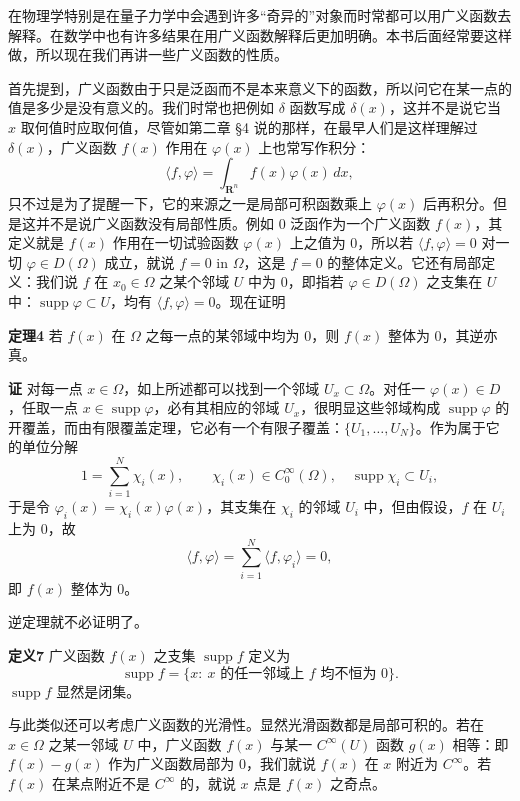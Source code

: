 在物理学特别是在量子力学中会遇到许多“奇异的”对象而时常都可以用广义函数去解释。在数学中也有许多结果在用广义函数解释后更加明确。本书后面经常要这样做，所以现在我们再讲一些广义函数的性质。

首先提到，广义函数由于只是泛函而不是本来意义下的函数，所以问它在某一点的值是多少是没有意义的。我们时常也把例如 $\delta$ 函数写成 $\delta(x)$，这并不是说它当 $x$ 取何值时应取何值，尽管如第二章 §4 说的那样，在最早人们是这样理解过 $\delta(x)$，广义函数 $f(x)$ 作用在 $\varphi(x)$ 上也常写作积分：
\[
 \langle f,\varphi\rangle=\int_{\mathbf R^n}f(x)\varphi(x)\,dx,
\]
只不过是为了提醒一下，它的来源之一是局部可积函数乘上 $\varphi(x)$ 后再积分。但是这并不是说广义函数没有局部性质。例如 0 泛函作为一个广义函数 $f(x)$，其定义就是 $f(x)$ 作用在一切试验函数 $\varphi(x)$ 上之值为 0，所以若 $\langle f,\varphi\rangle=0$ 对一切 $\varphi\in D(\Omega)$ 成立，就说 $f=0$ in $\Omega$，这是 $f=0$ 的整体定义。它还有局部定义：我们说 $f$ 在 $x_0\in\Omega$ 之某个邻域 $U$ 中为 0，即指若 $\varphi\in D(\Omega)$ 之支集在 $U$ 中：$\operatorname{supp}\varphi\subset U$，均有 $\langle f,\varphi\rangle=0$。现在证明

\noindent\textbf{定理4}
若 $f(x)$ 在 $\Omega$ 之每一点的某邻域中均为 0，则 $f(x)$ 整体为 0，其逆亦真。

\noindent\textbf{证}
对每一点 $x\in\Omega$，如上所述都可以找到一个邻域 $U_x\subset\Omega$。对任一 $\varphi(x)\in D$，任取一点 $x\in\operatorname{supp}\varphi$，必有其相应的邻域 $U_x$，很明显这些邻域构成 $\operatorname{supp}\varphi$ 的开覆盖，而由有限覆盖定理，它必有一个有限子覆盖：$\{U_1,\ldots,U_N\}$。作为属于它的单位分解
\[
 1=\sum_{i=1}^N\chi_i(x),\qquad
 \chi_i(x)\in C_0^\infty(\Omega),\quad \operatorname{supp}\chi_i\subset U_i,
\]
于是令 $\varphi_i(x)=\chi_i(x)\varphi(x)$，其支集在 $\chi_i$ 的邻域 $U_i$ 中，但由假设，$f$ 在 $U_i$ 上为 0，故
\[
 \langle f,\varphi\rangle=\sum_{i=1}^N\langle f,\varphi_i\rangle=0,
\]
即 $f(x)$ 整体为 0。

逆定理就不必证明了。

\noindent\textbf{定义7}
广义函数 $f(x)$ 之支集 $\operatorname{supp}f$ 定义为
\[
 \operatorname{supp}f=\{x:\ x\text{ 的任一邻域上 }f\text{ 均不恒为 }0\}.
\]
$\operatorname{supp}f$ 显然是闭集。

与此类似还可以考虑广义函数的光滑性。显然光滑函数都是局部可积的。若在 $x\in\Omega$ 之某一邻域 $U$ 中，广义函数 $f(x)$ 与某一 $C^\infty(U)$ 函数 $g(x)$ 相等：即 $f(x)-g(x)$ 作为广义函数局部为 0，我们就说 $f(x)$ 在 $x$ 附近为 $C^\infty$。若 $f(x)$ 在某点附近不是 $C^\infty$ 的，就说 $x$ 点是 $f(x)$ 之奇点。

